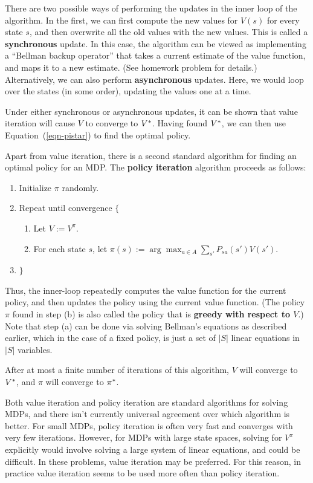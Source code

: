 \documentclass{article}
\begin{document}
There are two possible ways of performing the updates in the inner loop of the
algorithm.  In the first, we can first compute the new values for $V(s)$ for
every state $s$, and then overwrite all the old values with the new values.  This
is called a {\bf synchronous} update.  In this case, the algorithm can be
viewed as implementing a ``Bellman backup operator'' that takes a current estimate
of the value function, and maps it to a new estimate.  (See homework problem for
details.)  Alternatively, we can also perform {\bf asynchronous} updates.
Here, we would loop over the states (in some order), updating the values one at
a time.

Under either synchronous or asynchronous updates, it can be shown that
value iteration will cause $V$ to converge to ${V^{\ast}}$.
Having found ${V^{\ast}}$, we can then use Equation~(\ref{eqn-pistar}) to
find the optimal policy.

Apart from value iteration, there is a second standard algorithm for finding
an optimal policy for an MDP.  The {\bf policy iteration} algorithm proceeds as
follows:
\begin{enumerate}
\item Initialize $\pi$ randomly.
\item Repeat until convergence $\{$
\begin{enumerate}
\item Let $V := V^\pi$.
\item For each state $s$, let
$\pi(s) := \arg \max_{a \in A} \sum_{s'} P_{sa}(s') V(s')$.
\end{enumerate}
\item[] $\}$
\end{enumerate}
Thus, the inner-loop repeatedly computes the value function for the current
policy, and then updates the policy using the current value function.  (The policy
$\pi$ found in step (b) is also called the policy that is {\bf greedy with respect
to $V$}.) Note that step (a) can be done via solving Bellman's equations as
described earlier, which in the case of a fixed policy, is just a set
of $|S|$ linear equations in $|S|$ variables.

After at most a finite number of iterations of this algorithm,
$V$ will converge to ${V^{\ast}}$, and $\pi$ will converge to ${\pi^{\ast}}$.

Both value iteration and policy iteration are standard algorithms for solving
MDPs, and there isn't currently universal agreement over which algorithm is better.
For small MDPs, policy iteration is often very
fast and converges with very few iterations.  However, for MDPs with large
state spaces, solving for $V^\pi$ explicitly would involve solving a large
system of linear equations, and could be difficult.  In these problems,
value iteration may be preferred.  For this reason, in practice
value iteration seems to be used more often than policy iteration.
\end{document}
